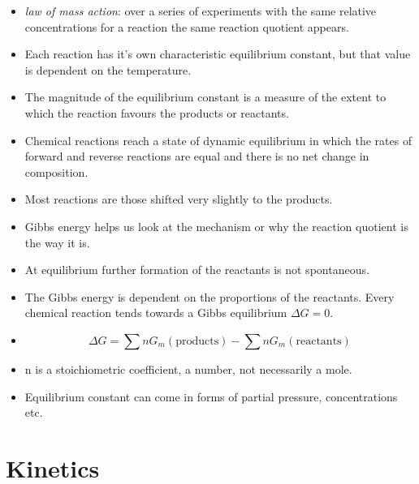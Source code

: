 \documentclass[12pt]{article}
\begin{document}
\begin{itemize}
\item
  \emph{law of mass action}: over a series of experiments with the same
  relative concentrations for a reaction the same reaction quotient
  appears.
\item
  Each reaction has it's own characteristic equilibrium constant, but
  that value is dependent on the temperature.
\item
  The magnitude of the equilibrium constant is a measure of the extent
  to which the reaction favours the products or reactants.
\item
  Chemical reactions reach a state of dynamic equilibrium in which the
  rates of forward and reverse reactions are equal and there is no net
  change in composition.
\item
  Most reactions are those shifted very slightly to the products.
\item
  Gibbs energy helps us look at the mechanism or why the reaction
  quotient is the way it is.
\item
  At equilibrium further formation of the reactants is not spontaneous.
\item
  The Gibbs energy is dependent on the proportions of the reactants.
  Every chemical reaction tends towards a Gibbs equilibrium
  \(\Delta G = 0\).
\item
  \[\Delta G = \sum nG_m(\text{products}) - \sum nG_m(\text{reactants})\]
\item
  n is a stoichiometric coefficient, a number, not necessarily a mole.
\item
  Equilibrium constant can come in forms of partial pressure,
  concentrations etc.
\end{itemize}

\section{Kinetics}\label{kinetics}
\end{document}
